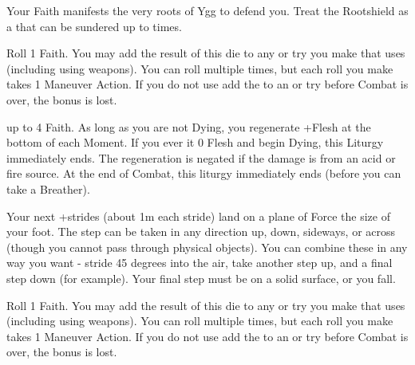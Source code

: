 \begin{multicols*}{2}
\newpage


\LITURGY [
  Name = Rootshield,
  Link = arcana-mystery-rootshield,
  Paradigm = Heathen,
  Duration=2 Maneuver Actions
]

Your Faith manifests the very roots of Ygg to defend you. Treat the Rootshield as a  that can be sundered up to \DICE times.

\LITURGY [
  Name = Sirocco,
  Link = arcana-mystery-sirocco,
  Paradigm = Empyrean,
  Duration=1 Maneuver Action
]

Roll 1 Faith. You may add the result of this die to any \RO or \RB try you make that uses \DEX (including using \DEX weapons). You can roll multiple times, but each roll you make takes 1 Maneuver Action. If you do not use add the \SUMDICE to an \RO or \RB try before Combat is over, the bonus is lost.

\LITURGY [
  Name = Trollblood,
  Link = arcana-mystery-trollblood,
  Paradigm = J{\UmlautO}tnar,
  Duration=2 Maneuver Actions
]

 up to 4 Faith. As long as you are not Dying, you regenerate +\DICE Flesh at the bottom of each Moment. If you ever it 0 Flesh and begin Dying, this Liturgy immediately ends. The regeneration is negated if the damage is from an acid or fire source. At the end of Combat, this liturgy immediately ends (before you can take a Breather).


\LITURGY [
  Name = Vaulting Step,
  Link = arcana-mystery-vaulting-step,
  Paradigm = Errant,
  Duration=1 Maneuver Action
]

Your next \DICE+\DICE strides (about 1m each stride) land on a plane of Force the size of your foot.  The step can be taken in any direction up, down, sideways, or across (though you cannot pass through physical objects).  You can combine these in any way you want - stride 45 degrees into the air, take another step up, and a final step down (for example).  Your final step must be on a solid surface, or you fall.

\LITURGY [
  Name = Vulpine Wisdom,
  Link = arcana-mystery-vulpine-wisdom,
  Paradigm = Cunning,
  Duration=1 Maneuver Action
]

Roll 1 Faith. You may add the result of this die to any \RO or \RB try you make that uses \INT (including using \INT weapons). You can roll multiple times, but each roll you make takes 1 Maneuver Action. If you do not use add the \SUMDICE to an \RO or \RB try before Combat is over, the bonus is lost.


\end{multicols*}
